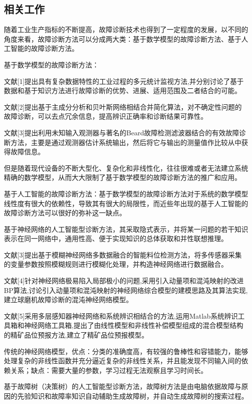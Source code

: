 \documentclass{ctacn}%
\begin{document}
\begin{multicols}{2}
\section{相关工作}
随着工业生产指标的不断提高，故障诊断技术也得到了一定程度的发展，以不同的角度来看，故障诊断方法可以分成两大类：基于数学模型的故障诊断方法、基于人工智能的故障诊断方法。

基于数学模型的故障诊断方法：

文献[1]提出具有复杂数据特性的工业过程的多元统计监视方法,并分别讨论了基于数据和基于知识方法进行故障诊断的优势、进展、适用范围及二者结合的可能。

文献[2]提出基于主成分分析和贝叶斯网络相结合并简化算法，对不确定性问题的故障诊断，可以去点冗余信息，提高辨识正确率和诊断结果可靠性。

文献[3]提出利用未知输入观测器与著名的Beard故障检测滤波器结合的有效故障诊断方法，主要是通过观测器估计系统输出，然后将它与输出的测量值作比较从中获得故障信息。

但是随着现代设备的不断大型化、复杂化和非线性化，往往很难或者无法建立系统精确的数学模型，从而大大限制了基于数学模型的故障诊断方法的推广和应用。

基于人工智能的故障诊断方法：基于数学模型的故障诊断方法对于系统的数学模型线性度有很大的依赖性，导致其有很大的局限性，而近些年出现的基于人工智能的故障诊断方法可以很好的弥补这一缺点。

基于神经网络的人工智能型诊断方法，其采取隐式表示，并将某一问题的若干知识表示在同一网络中，通用性高、便于实现知识的总体获取和并性联想推理。

文献[3]提出基于模糊神经网络多数据融合的智能料位检测方法，将多传感器采集的变量参数按照模糊规则进行模糊化处理，并构造神经网络进行数据融合。

文献[4]针对神经网络极易陷入局部极小的问题,采用引入动量项和混沌映射的改进BP算法,讨论引入动量项和混沌映射的神经网络综合模型的建模思路及其算法实现,建立球磨机故障诊断的混沌神经网络模型。

文献[5]采用多层感知器神经网络和系统辨识相结合的方法,运用Matlab系统辨识工具箱和神经网络工具箱,提出了由线性模型和非线性补偿模型组成的混合模型结构的精矿品位预报方法,建立了精矿品位预报模型。

传统的神经网络模型，优点：分类的准确度高，有较强的鲁棒性和容错能力，能够处理复杂的非线性函数并充分逼近复杂的非线性关系，并且能发现不同输入间的依赖关系；缺点：需要大量的参数，学习过程无法观察且学习时间长。

基于故障树（决策树）的人工智能型诊断方法，故障树方法是由电脑依据故障与原因的先验知识和故障率知识自动辅助生成故障树，并自动生成故障树的搜索过程。


\end{multicols}
\end{document}

